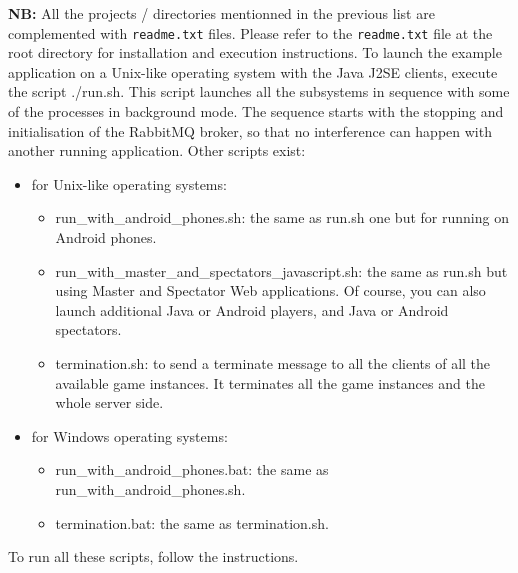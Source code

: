 \textbf{NB:} All the projects / directories mentionned in the previous
list are complemented with \texttt{readme.txt} files. Please refer to
the \texttt{readme.txt} file at the root directory for installation
and execution instructions.
\bigskip 
\newline 
{} 
\newline
\newline
To launch the example application on a Unix-like operating
system with the Java J2SE
clients, execute the script \textsf{./run.sh}. This script launches
all the subsystems in sequence with some of the processes in
background mode. The sequence starts with the stopping and
initialisation of the \textsf{RabbitMQ} broker, so that no
interference can happen with another running application. 
\newline
\newline
Other scripts exist:
\begin{itemize}
\item for Unix-like operating systems:
\begin{itemize}
\item \textsf{run\_with\_android\_phones.sh}: the same as \textsf{run.sh}
  one but for running on Android phones.
\item \textsf{run\_with\_master\_and\_spectators\_javascript.sh}: the 
same as \textsf{run.sh} but using Master and Spectator Web applications.
Of course, you can also launch additional Java or Android players, and 
Java or Android spectators.
\item \textsf{termination.sh}: to send a terminate message to all the
  clients of all the available game instances. It terminates all the
  game instances and the whole server side.
\end{itemize}
\item for Windows operating systems:
\begin{itemize}
\item \textsf{run\_with\_android\_phones.bat}: the same as \textsf{run\_with\_android\_phones.sh}.
\item \textsf{termination.bat}: the same as \textsf{termination.sh}.
\end{itemize}
\end{itemize}

To run all these scripts, follow the instructions.

\endinput
